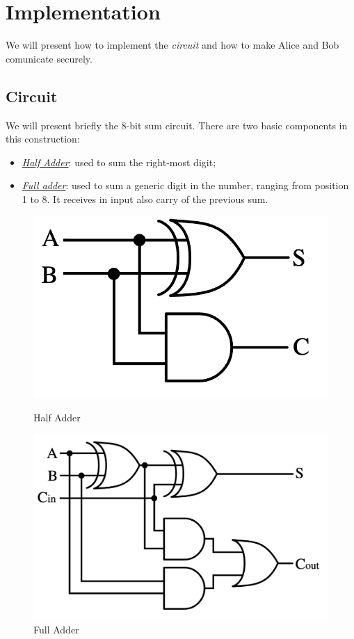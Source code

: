 \documentclass[12pt]{article}
\begin{document}
\section{Implementation}
We will present how to implement the \textit{circuit} and how to make Alice and Bob comunicate securely.
\subsection{Circuit}
We will present briefly the 8-bit sum circuit. There are two basic components in this construction:
\begin{itemize}
    \item \textit{\hyperref[half]{Half Adder}}: used to sum the right-most digit;
    \item \textit{\hyperref[full]{Full adder}}:  used to sum a generic digit in the number, ranging from position 1 to 8. It receives in input also carry of the previous sum.
\end{itemize}

\begin{figure}[!htb]
    \begin{minipage}{0.48\textwidth}
        \centering
        \includegraphics[width=.7\linewidth]{../src/images/Half_adder.png}
        \caption{Half Adder}\label{half}
    \end{minipage}
    \hfill
    \begin{minipage}{0.48\textwidth}
        \centering
        \includegraphics[width=.8\linewidth]{../src/images/Full-adder.png}
        \caption{Full Adder}\label{full}
    \end{minipage}
\end{figure}
\end{document}
